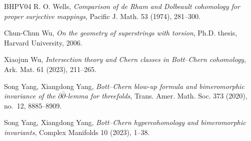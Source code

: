 \documentclass[11pt]{amsart}
\numberwithin{equation}{section}
\theoremstyle{plain}
\theoremstyle{definition}
\begin{document}
\begin{thebibliography}{BHPV04}
R. O. Wells,
\textit{Comparison of de Rham and Dolbeault cohomology for proper surjective
mappings},
Pacific J. Math. 53 (1974), 281--300.

Chun-Chun Wu,
\textit{On the geometry of superstrings with torsion},
Ph.D. thesis, Harvard University, 2006.

Xiaojun Wu,
\textit{Intersection theory and Chern classes in Bott--Chern cohomology},
Ark. Mat. 61 (2023), 211--265.

Song Yang, Xiangdong Yang,
\textit{Bott--Chern blow-up formula and bimeromorphic invariance of the
$\partial\bar\partial$-lemma for threefolds},
Trans. Amer. Math. Soc. 373 (2020), no.~12, 8885--8909.

Song Yang, Xiangdong Yang,
\textit{Bott--Chern hypercohomology and bimeromorphic invariants},
Complex Manifolds 10 (2023), 1--38.

\end{thebibliography}
\end{document}
